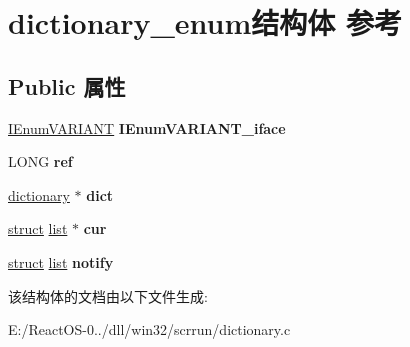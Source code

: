 \hypertarget{structdictionary__enum}{}\section{dictionary\+\_\+enum结构体 参考}
\label{structdictionary__enum}
\subsection*{Public 属性}
\begin{DoxyCompactItemize}
\item 
\mbox{\label{structdictionary__enum_a1af23f33ad3bfed7ddf8e3c11229066d}} 
\hyperlink{interface_i_enum_v_a_r_i_a_n_t}{I\+Enum\+V\+A\+R\+I\+A\+NT} {\bfseries I\+Enum\+V\+A\+R\+I\+A\+N\+T\+\_\+iface}
\item 
\mbox{\label{structdictionary__enum_a9e6fe9ed05649426cb820af673b18445}} 
L\+O\+NG {\bfseries ref}
\item 
\mbox{\label{structdictionary__enum_ac27955464740e732a409aba4dc27c7e2}} 
\hyperlink{structdictionary}{dictionary} $\ast$ {\bfseries dict}
\item 
\mbox{\label{structdictionary__enum_a76a091381ca06dd0d2ccfb3487638af9}} 
\hyperlink{interfacestruct}{struct} \hyperlink{classlist}{list} $\ast$ {\bfseries cur}
\item 
\mbox{\label{structdictionary__enum_a477354ba3743ac38ec66e0a4e7215664}} 
\hyperlink{interfacestruct}{struct} \hyperlink{classlist}{list} {\bfseries notify}
\end{DoxyCompactItemize}


该结构体的文档由以下文件生成\+:\begin{DoxyCompactItemize}
\item 
E\+:/\+React\+O\+S-\/0../dll/win32/scrrun/dictionary.\+c\end{DoxyCompactItemize}
